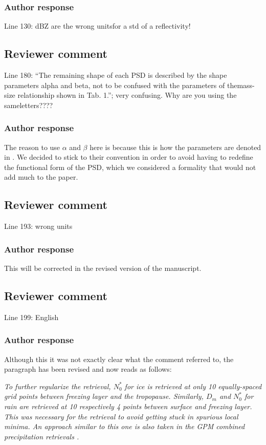 \documentclass[11pt]{scrartcl}
\begin{document}
\subsubsection*{Author response}
Line 130: dBZ are the wrong unitsfor a std of a reflectivity!

\subsection*{Reviewer comment}
Line 180: “The remaining shape of each PSD is described by the shape parameters alpha and beta, not to be confused with the parameters of themass-size relationship shown in Tab. 1.”; very confusing. Why are you using the sameletters????  
\subsubsection*{Author response}

The reason to use $\alpha$ and $\beta$ here is because this is how the
parameters are denoted in \citet{delanoe15}. We decided to stick to their
convention in order to avoid having to redefine the functional form of
the PSD, which we considered a formality that would not add much to the
paper.

\subsection*{Reviewer comment}
Line 193: wrong units 

\subsubsection*{Author response}

This will be corrected in the revised version of the manuscript.

\subsection*{Reviewer comment}
Line 199: English

\subsubsection*{Author response}

Although this it was not exactly clear what the comment referred to, the paragraph
has been revised and now reads as follows:

\textit{To further regularize the retrieval, $N_0^*$ for ice is retrieved at
  only 10 equally-spaced grid points between freezing layer and the tropopause.
  Similarly, $D_m$ and $N_0^*$ for rain are retrieved at 10 respectively 4
  points between surface and freezing layer. This was necessary for the
  retrieval to avoid getting stuck in spurious local minima. An approach similar
  to this one is also taken in the GPM combined precipitation retrievals
  \citep{grecu16}.}
\end{document}
